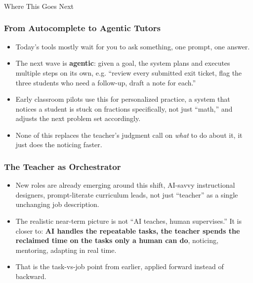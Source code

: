\begin{frame}[fragile]\frametitle{}
\begin{center}
{\Large Where This Goes Next}
\end{center}
\end{frame}

\begin{frame}[fragile]\frametitle{From Autocomplete to Agentic Tutors}
\begin{itemize}
\item Today's tools mostly wait for you to ask something, one prompt, one answer.
\item The next wave is \textbf{agentic}: given a goal, the system plans and executes multiple steps on its own, e.g. ``review every submitted exit ticket, flag the three students who need a follow-up, draft a note for each.''
\item Early classroom pilots use this for personalized practice, a system that notices a student is stuck on fractions specifically, not just ``math,'' and adjusts the next problem set accordingly.
\item None of this replaces the teacher's judgment call on \emph{what} to do about it, it just does the noticing faster.
\end{itemize}
\end{frame}

\begin{frame}[fragile]\frametitle{The Teacher as Orchestrator}
\begin{itemize}
\item New roles are already emerging around this shift, AI-savvy instructional designers, prompt-literate curriculum leads, not just ``teacher'' as a single unchanging job description.
\item The realistic near-term picture is not ``AI teaches, human supervises.'' It is closer to: \textbf{AI handles the repeatable tasks, the teacher spends the reclaimed time on the tasks only a human can do}, noticing, mentoring, adapting in real time.
\item That is the task-vs-job point from earlier, applied forward instead of backward.
\end{itemize}
\end{frame}
